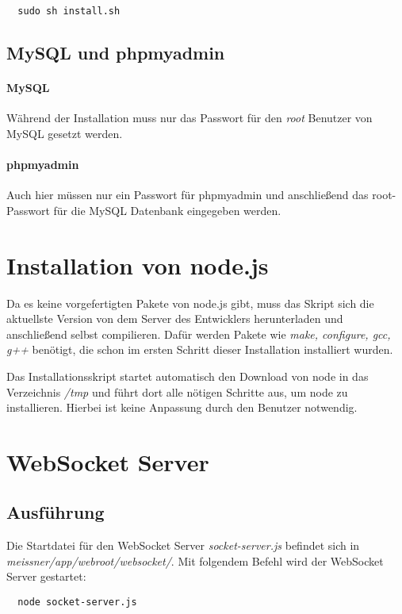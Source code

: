 \begin{lstlisting}
  sudo sh install.sh
\end{lstlisting}

\subsection{MySQL und phpmyadmin}
\paragraph{MySQL}
Während der Installation muss nur das Passwort für den \emph{root} Benutzer von MySQL gesetzt werden.

\paragraph{phpmyadmin}
Auch hier müssen nur ein Passwort für phpmyadmin und anschließend das root-Passwort für die MySQL Datenbank eingegeben werden.



\section{Installation von node.js}
Da es keine vorgefertigten Pakete von node.js gibt, muss das Skript sich die aktuellste Version von dem Server des Entwicklers herunterladen und anschließend selbst compilieren. Dafür werden Pakete wie \emph{make, configure, gcc, g++} benötigt, die schon im ersten Schritt dieser Installation installiert wurden.\par

Das Installationsskript startet automatisch den Download von node in das Verzeichnis \emph{/tmp} und führt dort alle nötigen Schritte aus, um node zu installieren. Hierbei ist keine Anpassung durch den Benutzer notwendig.


\section{WebSocket Server}
\subsection{Ausführung}
Die Startdatei für den WebSocket Server \emph{socket-server.js} befindet sich in \emph{meissner/app/webroot/websocket/}. Mit folgendem Befehl wird der WebSocket Server gestartet:\\
\begin{lstlisting}
  node socket-server.js
\end{lstlisting}

